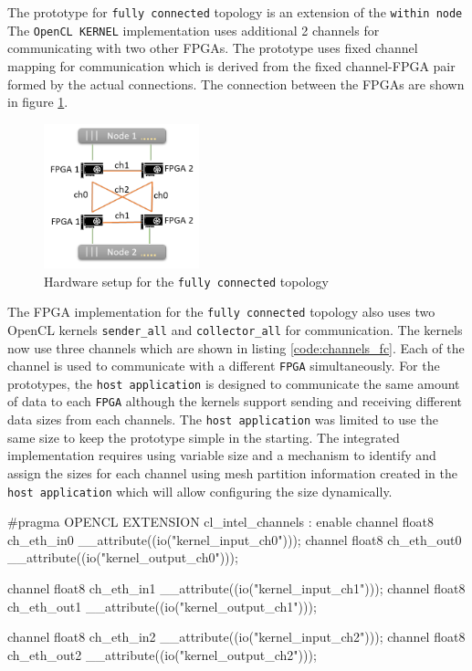 The prototype for \texttt{fully connected} topology is an extension of the \texttt{within node}
The \texttt{OpenCL KERNEL} implementation uses additional 2 channels for communicating with
two other FPGAs. The prototype uses fixed channel mapping for communication which is derived
from the fixed channel-FPGA pair formed by the actual connections. The connection between
the FPGAs are shown in figure \ref{fig:fc_topology}.

\begin{figure}[h]%
    \centering
    \includegraphics[width=0.4\textwidth]{images/fc_topology}
    \caption{Hardware setup for the \texttt{fully connected} topology}
    \label{fig:fc_topology}
\end{figure}

The FPGA implementation for the \texttt{fully connected} topology also uses two OpenCL kernels
\texttt{sender\_all} and \texttt{collector\_all} for communication. The kernels
now use three channels which are shown in listing \ref{code:channels_fc}.
Each of the channel is used to communicate with a different \texttt{FPGA} simultaneously.
For the prototypes, the \texttt{host application} is designed to communicate the same amount of data
to each \texttt{FPGA} although the kernels support sending and receiving different data
sizes from each channels. The \texttt{host application} was limited to use the same size to keep the prototype
simple in the starting. The integrated implementation requires using variable size and
a mechanism to identify and assign the sizes for each channel using mesh partition
information created in the \texttt{host application} which will allow configuring the size dynamically.

\begin{CppCode} [caption=Channels used for \texttt{fully connected} topology, frame=tlrb, label=code:channels_fc]
#pragma OPENCL EXTENSION cl_intel_channels : enable
channel float8 ch_eth_in0 __attribute((io("kernel_input_ch0")));
channel float8 ch_eth_out0 __attribute((io("kernel_output_ch0")));

channel float8 ch_eth_in1 __attribute((io("kernel_input_ch1")));
channel float8 ch_eth_out1 __attribute((io("kernel_output_ch1")));

channel float8 ch_eth_in2 __attribute((io("kernel_input_ch2")));
channel float8 ch_eth_out2 __attribute((io("kernel_output_ch2")));
\end{CppCode}

